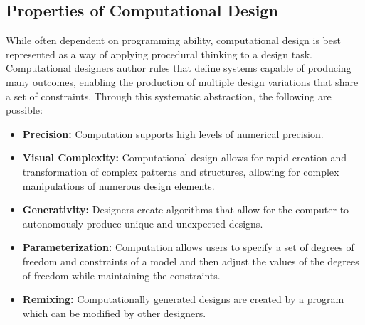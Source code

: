 \documentclass{sigchi}
\begin{document}
\subsection{Properties of Computational Design}
While often dependent on programming ability, computational design is best represented as a way of applying procedural thinking to a design task\cite{reas}. Computational designers author rules that define systems capable of producing many outcomes, enabling the production of  multiple design variations that share a set of constraints. Through this systematic abstraction, the following are possible:
\begin{itemize}
\item \textbf{Precision:} Computation supports high levels of numerical precision.
\vspace{-8pt}
\item \textbf{Visual Complexity:} Computational design allows for rapid creation and transformation of complex patterns and structures, allowing for complex manipulations of numerous design elements.
\vspace{-6pt}
\item \textbf{Generativity:} Designers create algorithms that allow for the computer to autonomously produce unique and unexpected designs.
\vspace{-6pt}
\item \textbf{Parameterization:} Computation allows users to specify a set of degrees of freedom and constraints of a model and then adjust the values of the degrees of freedom while maintaining the constraints.
\vspace{-6pt}
\item \textbf{Remixing:} Computationally generated designs are created by a program which can be modified by other designers. 
\end{itemize}	
\end{document}
